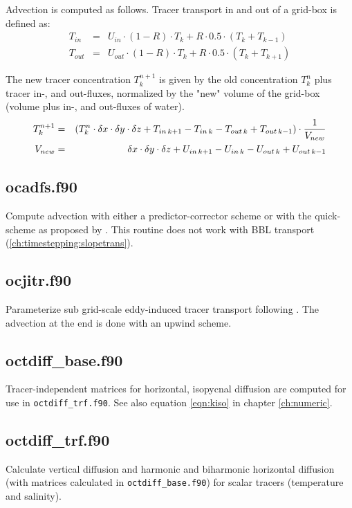 Advection is computed as follows. Tracer transport in and out of a grid-box is defined as:
\begin{eqnarray}
T_{in}&=& U_{in}\cdot(1-R)\cdot T_k + R\cdot 0.5 \cdot (T_k+T_{k-1}) \nonumber \\
T_{out}&=& U_{out}\cdot(1-R)\cdot T_k + R\cdot 0.5 \cdot (T_k+T_{k+1})
\end{eqnarray}

The new tracer concentration $T_k^{n+1}$ is given by the old concentration $T_k^n$ 
plus tracer in-, and out-fluxes,
normalized by the "new" volume of the grid-box (volume plus in-, and out-fluxes of water).
\begin{eqnarray}
T_k^{n+1}&=&  \left(T_k^n \cdot\delta x \cdot\delta y \cdot\delta z  
+ T_{in \, k+1} - T_{in \, k} - T_{out \, k} + T_{out \, k-1}\right)\cdot{1\over V_{new}}
\nonumber \\
V_{new}&=& \delta x \cdot\delta y \cdot\delta z 
+ U_{in \, k+1} - U_{in \, k} - U_{out \, k} + U_{out \, k-1}
\end{eqnarray}



\subsection{ocadfs.f90}
\label{ch:timestepping:ocadfs}
Compute advection with either a predictor-corrector scheme
or with the quick-scheme as proposed by \citet{Farrow:1995}.
This routine does not work with BBL transport (\ref{ch:timestepping:slopetrans}).
\subsection{ocjitr.f90}
\label{ch:timestepping:ocjitr}
Parameterize sub grid-scale eddy-induced tracer transport
following \citet{Gent:1995}. The advection at the end is done with an upwind scheme.
\subsection{octdiff\_base.f90}
\label{ch:timestepping:octdiff-base}
Tracer-independent matrices for horizontal, isopycnal diffusion are computed for use 
in \texttt{octdiff\_trf.f90}.
See also equation \ref{eqn:kiso} in chapter \ref{ch:numeric}.
\subsection{octdiff\_trf.f90}
\label{ch:timestepping:octdiff-trf}
Calculate vertical diffusion and harmonic and biharmonic horizontal diffusion 
(with matrices calculated in \texttt{octdiff\_base.f90}) for scalar tracers
(temperature and salinity).
